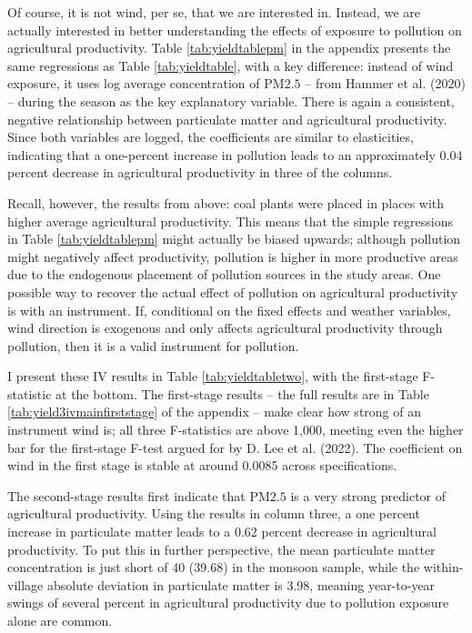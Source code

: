 \documentclass[
]{article}
\begin{document}
Of course, it is not wind, per se, that we are interested in. Instead, we are actually interested in better understanding the effects of exposure to pollution on agricultural productivity. Table \ref{tab:yieldtablepm} in the appendix presents the same regressions as Table \ref{tab:yieldtable}, with a key difference: instead of wind exposure, it uses log average concentration of \(\mathrm{PM 2.5}\) -- from Hammer et al. (2020) -- during the season as the key explanatory variable. There is again a consistent, negative relationship between particulate matter and agricultural productivity. Since both variables are logged, the coefficients are similar to elasticities, indicating that a one-percent increase in pollution leads to an approximately 0.04 percent decrease in agricultural productivity in three of the columns.

Recall, however, the results from above: coal plants were placed in places with higher average agricultural productivity. This means that the simple regressions in Table \ref{tab:yieldtablepm} might actually be biased upwards; although pollution might negatively affect productivity, pollution is higher in more productive areas due to the endogenous placement of pollution sources in the study areas. One possible way to recover the actual effect of pollution on agricultural productivity is with an instrument. If, conditional on the fixed effects and weather variables, wind direction is exogenous and only affects agricultural productivity through pollution, then it is a valid instrument for pollution.

I present these IV results in Table \ref{tab:yieldtabletwo}, with the first-stage F-statistic at the bottom. The first-stage results -- the full results are in Table \ref{tab:yield3ivmainfirststage} of the appendix -- make clear how strong of an instrument wind is; all three F-statistics are above 1,000, meeting even the higher bar for the first-stage F-test argued for by D. Lee et al. (2022). The coefficient on wind in the first stage is stable at around 0.0085 across specifications.

The second-stage results first indicate that \(\mathrm{PM 2.5}\) is a very strong predictor of agricultural productivity. Using the results in column three, a one percent increase in particulate matter leads to a 0.62 percent decrease in agricultural productivity. To put this in further perspective, the mean particulate matter concentration is just short of 40 (39.68) in the monsoon sample, while the within-village absolute deviation in particulate matter is 3.98, meaning year-to-year swings of several percent in agricultural productivity due to pollution exposure alone are common.
\end{document}
